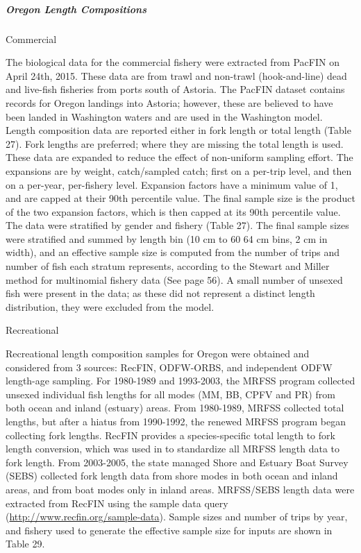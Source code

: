 \documentclass[11pt,
  english,
  letterpaper,
]{article}
\begin{document}
\hypertarget{oregon-length-compositions}{%
\subparagraph{Oregon Length Compositions}\label{oregon-length-compositions}}

Commercial

The biological data for the commercial fishery were extracted from PacFIN on April 24th, 2015. These data are from trawl and non-trawl (hook-and-line) dead and live-fish fisheries from ports south of Astoria. The PacFIN dataset contains records for Oregon landings into Astoria; however, these are believed to have been landed in Washington waters and are used in the Washington model. Length composition data are reported either in fork length or total length (Table 27). Fork lengths are preferred; where they are missing the total length is used. These data are expanded to reduce the effect of non-uniform sampling effort. The expansions are by weight, catch/sampled catch; first on a per-trip level, and then on a per-year, per-fishery level. Expansion factors have a minimum value of 1, and are capped at their 90th percentile value. The final sample size is the product of the two expansion factors, which is then capped at its 90th percentile value. The data were stratified by gender and fishery (Table 27). The final sample sizes were stratified and summed by length bin (10 cm to 60 64 cm bins, 2 cm in width), and an effective sample size is computed from the number of trips and number of fish each stratum represents, according to the Stewart and Miller method for multinomial fishery data (See page 56). A small number of unsexed fish were present in the data; as these did not represent a distinct length distribution, they were excluded from the model.

Recreational

Recreational length composition samples for Oregon were obtained and considered from 3 sources: RecFIN, ODFW-ORBS, and independent ODFW length-age sampling. For 1980-1989 and 1993-2003, the MRFSS program collected unsexed individual fish lengths for all modes (MM, BB, CPFV and PR) from both ocean and inland (estuary) areas. From 1980-1989, MRFSS collected total lengths, but after a hiatus from 1990-1992, the renewed MRFSS program began collecting fork lengths. RecFIN provides a species-specific total length to fork length conversion, which was used in to standardize all MRFSS length data to fork length. From 2003-2005, the state managed Shore and Estuary Boat Survey (SEBS) collected fork length data from shore modes in both ocean and inland areas, and from boat modes only in inland areas. MRFSS/SEBS length data were extracted from RecFIN using the sample data query (\url{http://www.recfin.org/sample-data}). Sample sizes and number of trips by year, and fishery used to generate the effective sample size for inputs are shown in Table 29.
\end{document}
